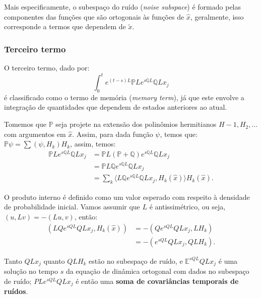 \documentclass[12pt]{article}
\begin{document}
Mais especificamente, o subespaço do ruído (\textit{noise subspace}) é formado pelas componentes das funções que são ortogonais às funções de $\hat{x}$, geralmente, isso corresponde a termos que dependem de $\tilde{x}$. 

\subsubsection{Terceiro termo}
O terceiro termo, dado por:
\begin{equation*}
    \int_0^t e^{(t-s)L} \mathbb{P}L e^{s\mathbb{Q}L} \mathbb{Q}L x_j
\end{equation*}
é classificado como o termo de memória  (\textit{memory term}), já que este envolve a integração de quantidades que dependem de estados anteriores ao atual.

Tomemos que $\mathbb{P}$ seja projete na extensão dos polinômios hermitianos $H-1, H_2, \ldots$ com argumentos em $\hat{x}$. Assim, para dada função $\psi$, temos que: $\mathbb{P}\psi = \sum (\psi, H_k)H_k$, assim, temos:
\begin{align*}
    \mathbb{P}Le^{s\mathbb{Q}L} \mathbb{Q}Lx_j &= \mathbb{P}L(\mathbb{P} + \mathbb{Q})e^{s\mathbb{Q}L} \mathbb{Q}Lx_j \\
    &= \mathbb{P}L\mathbb{Q}e^{s\mathbb{Q}L} \mathbb{Q}Lx_j \\
    &= \sum_k \langle L\mathbb{Q}e^{s\mathbb{Q}L} \mathbb{Q}Lx_j, H_k(\hat{x}) \rangle H_k(\hat{x}).
\end{align*}

O produto interno é definido como um valor esperado com respeito à densidade de probabilidade inicial. Vamos assumir que $L$ é antissimétrico, ou seja, $(u, Lv) = -(Lu, v)$, então:
\begin{align*}
    (L Q e^{s Q L} Q L x_j, H_k(\hat{x})) 
    &= - (Q e^{s Q L} Q L x_j, L H_k) \\
    &= - (e^{s Q L} Q L x_j, Q L H_k).
\end{align*}

Tanto $Q L x_j$ quanto $Q L H_k$ estão no subespaço de ruído, e $\mathbb{E}^{s Q L} Q L x_j$ é uma solução no tempo $s$ da equação de dinâmica ortogonal com dados no subespaço de ruído; $P L e^{s Q L} Q L x_j$ é então uma \textbf{soma de covariâncias temporais de ruídos}.




\newpage
\nocite{*}
\printbibliography
\end{document}

